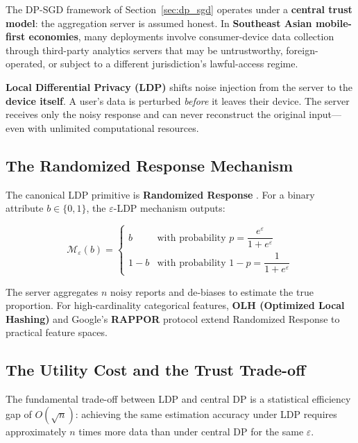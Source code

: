 The DP-SGD framework of Section~\ref{sec:dp_sgd} operates under a \textbf{central trust model}: the aggregation server is assumed honest. In \textbf{Southeast Asian mobile-first economies}, many deployments involve consumer-device data collection through third-party analytics servers that may be untrustworthy, foreign-operated, or subject to a different jurisdiction's lawful-access regime.

\textbf{Local Differential Privacy (LDP)} shifts noise injection from the server to the \textbf{device itself}. A user's data is perturbed \emph{before} it leaves their device. The server receives only the noisy response and can never reconstruct the original input---even with unlimited computational resources.

\subsection{The Randomized Response Mechanism}
\label{subsec:randomized_response}

The canonical LDP primitive is \textbf{Randomized Response} \cite{warner1965}. For a binary attribute $b \in \{0, 1\}$, the $\varepsilon$-LDP mechanism outputs:

\begin{equation}
\mathcal{M}_\varepsilon(b) =
\begin{cases}
b       & \text{with probability } p = \dfrac{e^\varepsilon}{1 + e^\varepsilon} \\[6pt]
1 - b   & \text{with probability } 1 - p = \dfrac{1}{1 + e^\varepsilon}
\end{cases}
\label{eq:randomized_response}
\end{equation}

The server aggregates $n$ noisy reports and de-biases to estimate the true proportion. For high-cardinality categorical features, \textbf{OLH (Optimized Local Hashing)} and Google's \textbf{RAPPOR} protocol extend Randomized Response to practical feature spaces.

\subsection{The Utility Cost and the Trust Trade-off}
\label{subsec:ldp_utility}

The fundamental trade-off between LDP and central DP is a statistical efficiency gap of $O(\sqrt{n})$: achieving the same estimation accuracy under LDP requires approximately $n$ times more data than under central DP for the same $\varepsilon$.

